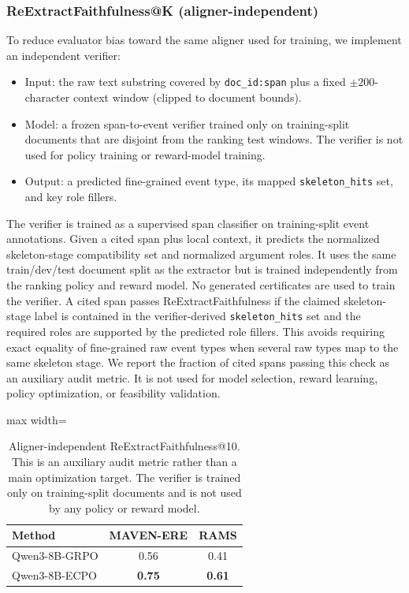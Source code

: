 \documentclass{article}
\newcommand{\ECPO}{\textsc{ECPO}}
\begin{document}
\subsubsection{ReExtractFaithfulness@K (aligner-independent)}
\label{sec:app_explain_reextract}

To reduce evaluator bias toward the same aligner used for training, we implement an independent verifier:
\begin{itemize}
    \item Input: the raw text substring covered by \texttt{doc\_id:span} plus a fixed $\pm 200$-character context window (clipped to document bounds).
    \item Model: a frozen span-to-event verifier trained only on training-split documents that are disjoint from the ranking test windows.
    The verifier is not used for policy training or reward-model training.
    \item Output: a predicted fine-grained event type, its mapped \texttt{skeleton\_hits} set, and key role fillers.
\end{itemize}
The verifier is trained as a supervised span classifier on training-split event annotations.
Given a cited span plus local context, it predicts the normalized skeleton-stage compatibility set and normalized argument roles.
It uses the same train/dev/test document split as the extractor but is trained independently from the ranking policy and reward model.
No generated certificates are used to train the verifier.
A cited span passes ReExtractFaithfulness if the claimed skeleton-stage label is contained in the verifier-derived \texttt{skeleton\_hits} set and the required roles are supported by the predicted role fillers.
This avoids requiring exact equality of fine-grained raw event types when several raw types map to the same skeleton stage.
We report the fraction of cited spans passing this check as an auxiliary audit metric.
It is not used for model selection, reward learning, policy optimization, or feasibility validation.

\begin{table}[t]
\centering
\caption{Aligner-independent ReExtractFaithfulness@10.
This is an auxiliary audit metric rather than a main optimization target.
The verifier is trained only on training-split documents and is not used by any policy or reward model.}
\label{tab:reextract_faithfulness}
\small
\begin{adjustbox}{max width=\linewidth}
\begin{tabular}{lcc}
\hline
Method & MAVEN-ERE & RAMS \\
\hline
Qwen3-8B-GRPO & 0.56 & 0.41 \\
Qwen3-8B-\ECPO & \textbf{0.75} & \textbf{0.61} \\
\hline
\end{tabular}
\end{adjustbox}
\end{table}
\end{document}
